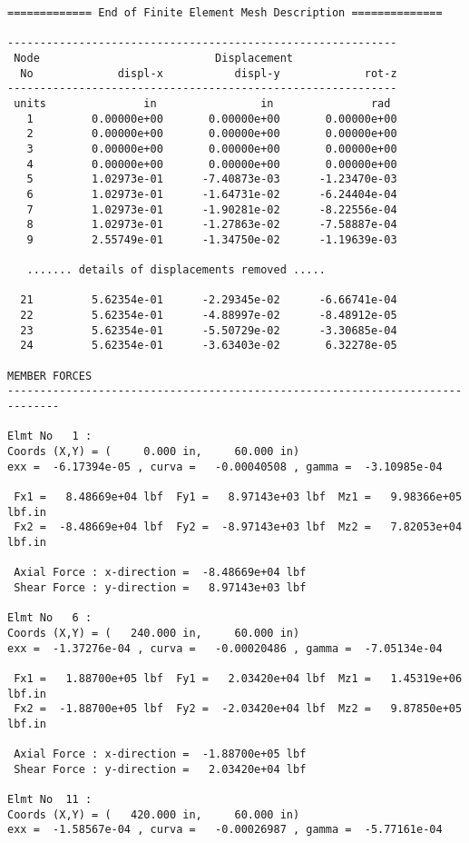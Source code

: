 \begin{footnotesize}
\begin{verbatim}
============= End of Finite Element Mesh Description ==============

------------------------------------------------------------
 Node                           Displacement
  No             displ-x           displ-y             rot-z
------------------------------------------------------------
 units               in                in               rad 
   1         0.00000e+00       0.00000e+00       0.00000e+00
   2         0.00000e+00       0.00000e+00       0.00000e+00
   3         0.00000e+00       0.00000e+00       0.00000e+00
   4         0.00000e+00       0.00000e+00       0.00000e+00
   5         1.02973e-01      -7.40873e-03      -1.23470e-03
   6         1.02973e-01      -1.64731e-02      -6.24404e-04
   7         1.02973e-01      -1.90281e-02      -8.22556e-04
   8         1.02973e-01      -1.27863e-02      -7.58887e-04
   9         2.55749e-01      -1.34750e-02      -1.19639e-03

   ....... details of displacements removed .....

  21         5.62354e-01      -2.29345e-02      -6.66741e-04
  22         5.62354e-01      -4.88997e-02      -8.48912e-05
  23         5.62354e-01      -5.50729e-02      -3.30685e-04
  24         5.62354e-01      -3.63403e-02       6.32278e-05

MEMBER FORCES 
------------------------------------------------------------------------------

Elmt No   1 : 
Coords (X,Y) = (     0.000 in,     60.000 in)
exx =  -6.17394e-05 , curva =   -0.00040508 , gamma =  -3.10985e-04

 Fx1 =   8.48669e+04 lbf  Fy1 =   8.97143e+03 lbf  Mz1 =   9.98366e+05 lbf.in
 Fx2 =  -8.48669e+04 lbf  Fy2 =  -8.97143e+03 lbf  Mz2 =   7.82053e+04 lbf.in

 Axial Force : x-direction =  -8.48669e+04 lbf
 Shear Force : y-direction =   8.97143e+03 lbf

Elmt No   6 : 
Coords (X,Y) = (   240.000 in,     60.000 in)
exx =  -1.37276e-04 , curva =   -0.00020486 , gamma =  -7.05134e-04

 Fx1 =   1.88700e+05 lbf  Fy1 =   2.03420e+04 lbf  Mz1 =   1.45319e+06 lbf.in
 Fx2 =  -1.88700e+05 lbf  Fy2 =  -2.03420e+04 lbf  Mz2 =   9.87850e+05 lbf.in

 Axial Force : x-direction =  -1.88700e+05 lbf
 Shear Force : y-direction =   2.03420e+04 lbf

Elmt No  11 : 
Coords (X,Y) = (   420.000 in,     60.000 in)
exx =  -1.58567e-04 , curva =   -0.00026987 , gamma =  -5.77161e-04


\end{verbatim}
\end{footnotesize}

